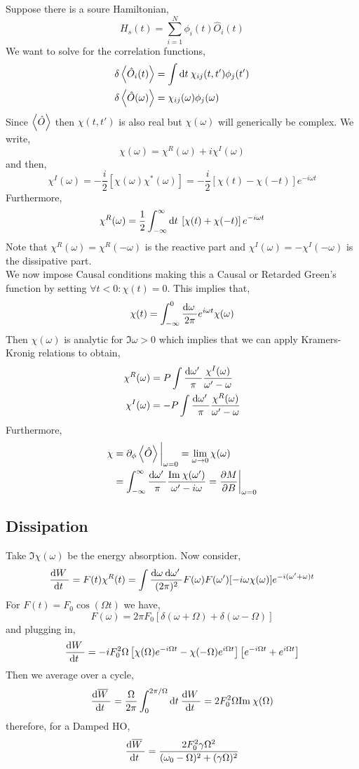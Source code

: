 \documentclass[12pt]{article}
\begin{document}
Suppose there is a soure Hamiltonian, 
\[
 H_s(t) = \sum_{i = 1}^N \phi_i(t) \hat{O}_i(t) \]
We want to solve for the correlation functions,
\begin{align*}
\delta \left< \hat{O}_i(t) \right> & = \int \mathrm{d}t \: \chi_{ij}(t, t') \phi_j(t') 
\\
\delta \left< \hat{O}(\omega) \right> & = \chi_{ij}(\omega) \phi_j(\omega)
\end{align*}
Since $\left< \hat{O} \right>$ then $\chi(t, t')$ is also real but $\chi(\omega)$ will generically be complex. We write,
\[ \chi(\omega) = \chi^R(\omega) + i \chi^I(\omega) \]
and then,
\[ \chi^I(\omega) = - \frac{i}{2} \left[ \chi(\omega)  \chi^*(\omega) \right] = - \frac{i}{2} \left[ \chi(t) - \chi(-t) \right] e^{- i \omega t} \]
Furthermore,
\[ \chi^R(\omega) = \frac{1}{2} \int^{\infty}_{-\infty} \mathrm{d}t \: \left[ \chi(t) + \chi(-t) \right] e^{- i \omega t} \]
Note that $\chi^R(\omega) = \chi^R(-\omega)$ is the reactive part and $\chi^I(\omega) = - \chi^I(-\omega)$ is the dissipative part. 
\bigskip\\
We now impose Causal conditions making this a Causal or Retarded Green's function by setting $\forall t < 0 : \chi(t) = 0$. This implies that,
\[ \chi(t) = \int^0_{-\infty} \frac{\mathrm{d}\omega \:}{2 \pi} e^{i \omega t} \chi(\omega) \]
Then $\chi(\omega)$ is analytic for $\Im{\omega} > 0$ which implies that we can apply Kramers-Kronig relations to obtain,
\begin{align*}
\chi^R(\omega) & = P \int \frac{\mathrm{d}\omega' \:}{\pi} \frac{\chi^I(\omega)}{\omega' - \omega} 
\\
\chi^I(\omega) & = - P \int \frac{\mathrm{d}\omega' \:}{\pi} \frac{\chi^R(\omega)}{\omega' - \omega}  
\end{align*}
Furthermore,
\begin{align*}
\chi & = \partial_\phi \left< \hat{O} \right> \bigg|_{\omega = 0} = \lim_{\omega \to 0} \chi(\omega)
\\
& = \int_{-\infty}^{\infty} \frac{\mathrm{d}\omega' \:}{\pi} \frac{\mathrm{Im} \: \chi(\omega')}{\omega' - i \omega} = \frac{\partial{M}}{\partial{B}} \bigg|_{\omega = 0}
\end{align*} 

\subsection{Dissipation}

Take $\Im{\chi(\omega)}$ be the energy absorption. Now consider,
\[ \frac{\mathrm{d}W \:}{\mathrm{d}t \:} = F(t) \chi^R(t) = \int \frac{\mathrm{d}\omega \: \mathrm{d}\omega' \:}{(2 \pi)^2} F(\omega) F(\omega') [ - i \omega \chi(\omega) ] e^{- i ( \omega' + \omega) t} \]
For $F(t) = F_0 \cos{(\Omega t)}$ we have,
\[ F(\omega) = 2 \pi F_0 [\delta(\omega + \Omega) + \delta(\omega - \Omega) ] \]
and plugging in,
\[ \frac{\mathrm{d}W \:}{\mathrm{d}t \:} = - i F_0^2 \Omega \left[ \chi(\Omega) e^{- i \Omega t} - \chi(-\Omega) e^{i \Omega t} \right] \left[ e^{-i \Omega t} + e^{i \Omega t} \right] \]
Then we average over a cycle,
\[ \frac{\mathrm{d}\overline{W} \:}{\mathrm{d}t \:} = \frac{\Omega}{2 \pi} \int_0^{2 \pi / \Omega} \mathrm{d}t \: \frac{\mathrm{d}W \:}{\mathrm{d}t \:} = 2 F_0^2 \Omega \mathrm{Im} \: \chi(\Omega) \]
therefore, for a Damped HO,
\[ \frac{\mathrm{d}\overline{W} \:}{\mathrm{d}t \:} = \frac{2 F_0^2 \gamma \Omega^2}{(\omega_0 - \Omega)^2 + (\gamma \Omega)^2} \]
\end{document}
